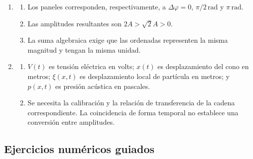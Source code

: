 \begin{enumerate}[label=\textbf{R\arabic*.},leftmargin=*]
    \item
    \begin{enumerate}[label=\alph*)]
        \item Los paneles corresponden, respectivamente, a
        \(\Delta\varphi=0\), \(\pi/2\,\text{rad}\) y
        \(\pi\,\text{rad}\).
        \item Las amplitudes resultantes son
        \(2A>\sqrt{2}A>0\).
        \item La suma algebraica exige que las ordenadas representen la misma
        magnitud y tengan la misma unidad.
    \end{enumerate}

    \item
    \begin{enumerate}[label=\alph*)]
        \item \(V(t)\) es tensión eléctrica en volts; \(x(t)\) es
        desplazamiento del cono en metros; \(\xi(x,t)\) es desplazamiento
        local de partícula en metros; y \(p(x,t)\) es presión acústica en
        pascales.
        \item Se necesita la calibración y la relación de transferencia de la
        cadena correspondiente. La coincidencia de forma temporal no
        establece una conversión entre amplitudes.
    \end{enumerate}
\end{enumerate}

\subsection*{Ejercicios numéricos guiados}

